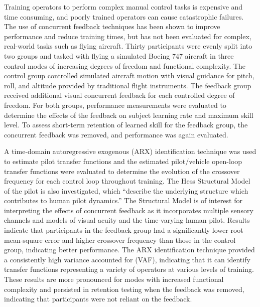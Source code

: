 Training operators to perform complex manual control tasks is expensive and time consuming, and poorly trained operators can cause catastrophic failures.
The use of concurrent feedback techniques has been shown to improve performance and reduce training times, but has not been evaluated for complex, real-world tasks such as flying aircraft.
Thirty participants were evenly split into two groups and tasked with flying a simulated Boeing 747 aircraft in three control modes of increasing degrees of freedom and functional complexity.
The control group controlled simulated aircraft motion with visual guidance for pitch, roll, and altitude provided by traditional flight instruments.
The feedback group received additional visual concurrent feedback for each controlled degree of freedom.
For both groups, performance measurements were evaluated to determine the effects of the feedback on subject learning rate and maximum skill level.
To assess short-term retention of learned skill for the feedback group, the concurrent feedback was removed, and performance was again evaluated.

A time-domain autoregressive exogenous (ARX) identification technique was used to estimate pilot transfer functions and the estimated pilot/vehicle open-loop transfer functions were evaluated to determine the evolution of the crossover frequency for each control loop throughout training.
The Hess Structural Model of the pilot is also investigated, which “describe the underlying structure which contributes to human pilot dynamics.'' The Structural Model is of interest for interpreting the effects of concurrent feedback as it incorporates multiple sensory channels and models of visual acuity and the time-varying human pilot.
Results indicate that participants in the feedback group had a significantly lower root-mean-square error and higher crossover frequency than those in the control group, indicating better performance.
The ARX identification technique provided a consistently high variance accounted for (VAF), indicating that it can identify transfer functions representing a variety of operators at various levels of training.
These results are more pronounced for modes with increased functional complexity and persisted in retention testing when the feedback was removed, indicating that participants were not reliant on the feedback.


